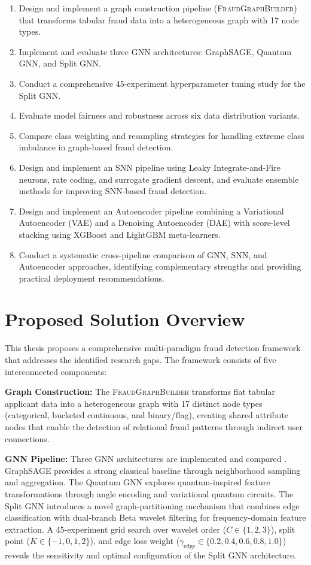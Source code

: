 \begin{enumerate}[label=O\arabic*.]
\item Design and implement a graph construction pipeline (\textsc{FraudGraphBuilder}) that transforms tabular fraud data into a heterogeneous graph with 17 node types.
\item Implement and evaluate three GNN architectures: GraphSAGE, Quantum GNN, and Split GNN.
\item Conduct a comprehensive 45-experiment hyperparameter tuning study for the Split GNN.
\item Evaluate model fairness and robustness across six data distribution variants.
\item Compare class weighting and resampling strategies for handling extreme class imbalance in graph-based fraud detection.
\item Design and implement an SNN pipeline using Leaky Integrate-and-Fire neurons, rate coding, and surrogate gradient descent, and evaluate ensemble methods for improving SNN-based fraud detection.
\item Design and implement an Autoencoder pipeline combining a Variational Autoencoder (VAE) and a Denoising Autoencoder (DAE) with score-level stacking using XGBoost and LightGBM meta-learners.
\item Conduct a systematic cross-pipeline comparison of GNN, SNN, and Autoencoder approaches, identifying complementary strengths and providing practical deployment recommendations.
\end{enumerate}

\section{Proposed Solution Overview}

This thesis proposes a comprehensive multi-paradigm fraud detection framework that addresses the identified research gaps. The framework consists of five interconnected components:

\textbf{Graph Construction:} The \textsc{FraudGraphBuilder} transforms flat tabular applicant data into a heterogeneous graph with 17 distinct node types (categorical, bucketed continuous, and binary/flag), creating shared attribute nodes that enable the detection of relational fraud patterns through indirect user connections.

\textbf{GNN Pipeline:} Three GNN architectures are implemented and compared \cite{cheng2024graph}. GraphSAGE provides a strong classical baseline through neighborhood sampling and aggregation. The Quantum GNN explores quantum-inspired feature transformations through angle encoding and variational quantum circuits. The Split GNN introduces a novel graph-partitioning mechanism that combines edge classification with dual-branch Beta wavelet filtering for frequency-domain feature extraction. A 45-experiment grid search over wavelet order ($C \in \{1,2,3\}$), split point ($K \in \{-1,0,1,2\}$), and edge loss weight ($\gamma_{\text{edge}} \in \{0.2, 0.4, 0.6, 0.8, 1.0\}$) reveals the sensitivity and optimal configuration of the Split GNN architecture.

